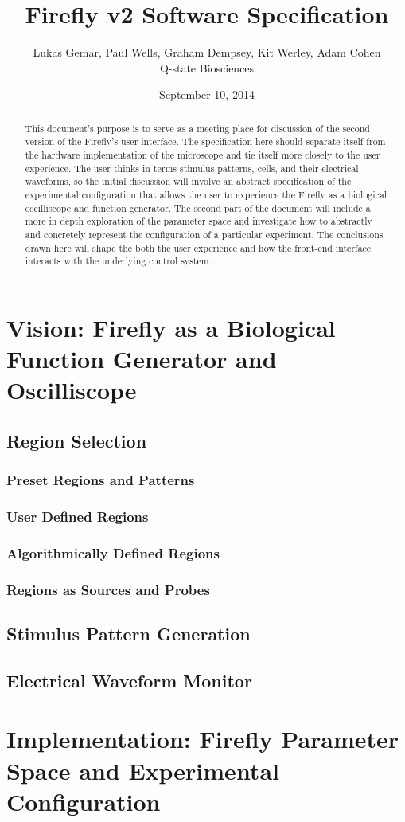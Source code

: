 \documentclass[a4paper,12pt]{article}
\begin{document}
\title{Firefly v2 Software Specification}
\author{Lukas Gemar, Paul Wells, Graham Dempsey, Kit Werley, Adam Cohen\\
		Q-state Biosciences}
\date{September 10, 2014}
\maketitle

\begin{abstract}
This document's purpose is to serve as a meeting place for discussion of
the second version of the Firefly's user interface. The specification here
should separate itself from the hardware implementation of the microscope
and tie itself more closely to the user experience. The user thinks in terms
stimulus patterns, cells, and their electrical waveforms, so the initial 
discussion will involve an abstract specification of the experimental configuration 
that allows the user to experience the Firefly as a biological oscilliscope 
and function generator. The second part of the document will include a more 
in depth exploration of the parameter space and investigate how to 
abstractly and concretely represent the configuration of a particular 
experiment. The conclusions drawn here will shape the both the user 
experience and how the front-end interface interacts with the underlying 
control system.
\end{abstract}
\section{Vision: Firefly as a Biological Function Generator and Oscilliscope}
\subsection{Region Selection}
\subsubsection{Preset Regions and Patterns}
\subsubsection{User Defined Regions}
\subsubsection{Algorithmically Defined Regions}
\subsubsection{Regions as Sources and Probes}
\subsection{Stimulus Pattern Generation}
\subsection{Electrical Waveform Monitor}
\section{Implementation: Firefly Parameter Space and Experimental Configuration}
\end{document}
